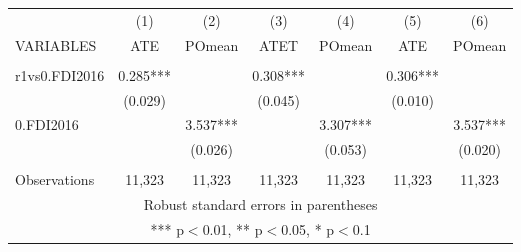 \documentclass[]{article}
\begin{document}
\begin{tabular}{lcccccc} \hline
 & (1) & (2) & (3) & (4) & (5) & (6) \\
VARIABLES & ATE & POmean & ATET & POmean & ATE & POmean \\ \hline
 &  &  &  &  &  &  \\
r1vs0.FDI2016 & 0.285*** &  & 0.308*** &  & 0.306*** &  \\
 & (0.029) &  & (0.045) &  & (0.010) &  \\
0.FDI2016 &  & 3.537*** &  & 3.307*** &  & 3.537*** \\
 &  & (0.026) &  & (0.053) &  & (0.020) \\
 &  &  &  &  &  &  \\
 Observations & 11,323 & 11,323 & 11,323 & 11,323 & 11,323 & 11,323 \\ \hline
\multicolumn{7}{c}{ Robust standard errors in parentheses} \\
\multicolumn{7}{c}{ *** p$<$0.01, ** p$<$0.05, * p$<$0.1} \\
\end{tabular}
\end{document}
